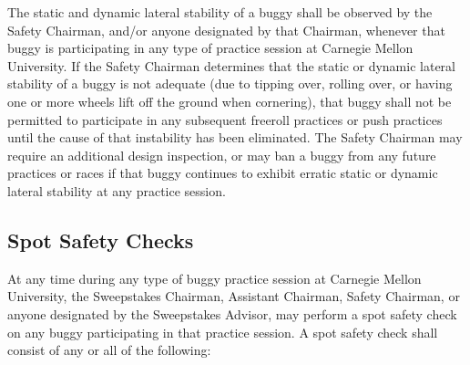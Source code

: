 \begin{itemize}
		The static and dynamic lateral stability of a buggy shall be observed by the
		Safety Chairman, and/or anyone designated by that Chairman, whenever that buggy
		is participating in any type of practice session at Carnegie Mellon University.
		If the Safety Chairman determines that the static or dynamic lateral stability
		of a buggy is not adequate (due to tipping over, rolling over, or having one or
		more wheels lift off the ground when cornering), that buggy shall not be
		permitted to participate in any subsequent freeroll practices or push practices
		until the cause of that instability has been eliminated. The Safety Chairman
		may require an additional design inspection, or may ban a buggy from any future
		practices or races if that buggy continues to exhibit erratic static or dynamic
		lateral stability at any practice session.

	\end{itemize}

\subsection{Spot Safety Checks}

	At any time during any type of buggy practice session at Carnegie Mellon
	University, the Sweepstakes Chairman, Assistant Chairman, Safety Chairman, or
	anyone designated by the Sweepstakes Advisor, may perform a spot safety check
	on any buggy participating in that practice session. A spot safety check shall
	consist of any or all of the following:

